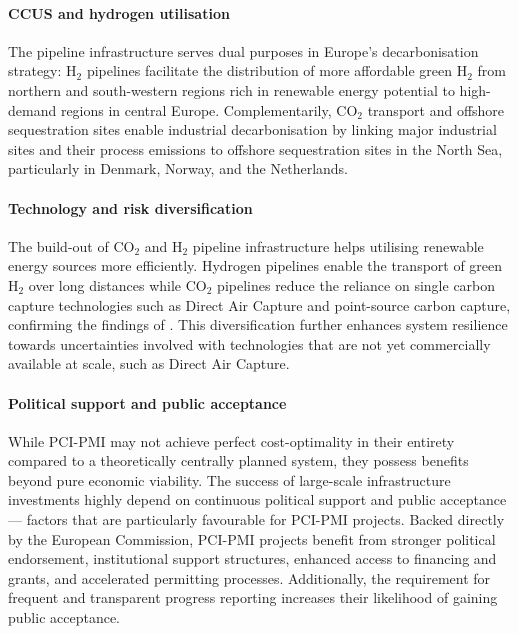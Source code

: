 \documentclass[pdflatex,sn-nature]{sn-jnl}%
\theoremstyle{thmstyleone}%
\theoremstyle{thmstyletwo}%
\theoremstyle{thmstylethree}%
\begin{document}
\paragraph{CCUS and hydrogen utilisation}
The pipeline infrastructure serves dual purposes in Europe's decarbonisation strategy: H$_2$ pipelines facilitate the distribution of more affordable green H$_2$ from northern and south-western regions rich in renewable energy potential to high-demand regions in central Europe. Complementarily, CO$_2$ transport and offshore sequestration sites enable industrial decarbonisation by linking major industrial sites and their process emissions to offshore sequestration sites in the North Sea, particularly in Denmark, Norway, and the Netherlands.

\paragraph{Technology and risk diversification}
The build-out of CO$_2$ and H$_2$ pipeline infrastructure helps utilising renewable energy sources more efficiently. Hydrogen pipelines enable the transport of green H$_2$ over long distances while CO$_2$ pipelines reduce the reliance on single carbon capture technologies such as Direct Air Capture and point-source carbon capture, confirming the findings of \cite{hofmannH2CO2Network2025}. This diversification further enhances system resilience towards uncertainties involved with technologies that are not yet commercially available at scale, such as Direct Air Capture.

\paragraph{Political support and public acceptance} 
While PCI-PMI may not achieve perfect cost-optimality in their entirety compared to a theoretically centrally planned system, they possess benefits beyond pure economic viability. The success of large-scale infrastructure investments highly depend on continuous political support and public acceptance --- factors that are particularly favourable for PCI-PMI projects.
Backed directly by the European Commission, PCI-PMI projects benefit from stronger political endorsement, institutional support structures, enhanced access to financing and grants, and accelerated permitting processes. Additionally, the requirement for frequent and transparent progress reporting increases their likelihood of gaining public acceptance.
\end{document}
